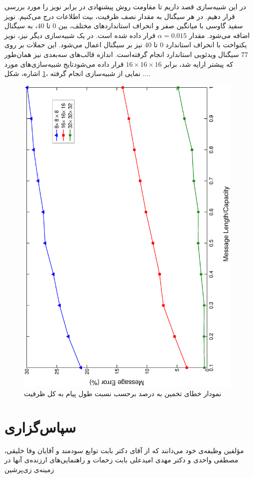\documentclass[11pt,a4paper,twocolumn]{article}
\makeatletter
\numberwithin{table}{section}
\let\orig@lr\lr
\renewcommand*{\lr}[1]{\texorpdfstring{\orig@lr{#1}}{#1}}
\makeatother
\begin{document}
  در این شبیه‌سازی قصد داریم تا مقاومت روش پیشنهادی در برابر نویز را مورد بررسی قرار دهیم. در هر سیگنال به مقدار نصف ظرفیت، بیت اطلاعات درج می‌کنیم. نویز سفید گاوسی با میانگین صفر و انحراف استانداردهای مختلف، بین  $0$  تا $40$، به سیگنال اضافه می‌شود. مقدار $\alpha = 0.015$ قرار داده شده است. در یک شبیه‌سازی دیگر نیز، نویز یکنواخت با انحراف استاندارد {$0$} تا {$40$} نیز بر سیگنال اعمال می‌شود.  این حملات بر روی 77 سیگنال ویدئویی استاندارد انجام گرفته‌است. اندازه قالب‌های سه‌بعدی نیز همان‌طور که پیشتر ارایه شد، برابر $16 \times 16 \times 16$ قرار داده می‌شودتایج شبیه‌سازی‌های مورد اشاره،  شکل‌ ‎\ref{fig:Errorblock}‎، نمایی از شبیه‌سازی انجام گرفته ....
\begin{figure}
\centering
\includegraphics[width=0.7\linewidth,angle=270]{./Images/Errorblock}
\caption{
نمودار خطای تخمین به درصد برحسب نسبت طول پیام به کل ظرفیت
}
\label{fig:Errorblock}
\end{figure}


\section*{سپاس‌گزاری}
مؤلفین وظیفه‌ی خود می‌دانند که از آقای دکتر  بابت توابع سودمند   و آقایان وفا خلیقی، مصطفی واحدی و دکتر مهدی امیدعلی بابت زحمات و راهنمایی‌های ارزنده‌ی آنها در زمینه‌ی زی‌پرشین


\small
\singlespacing


\renewcommand{\refname}{\rl{{مراجع}\hfill}}



\end{document}
